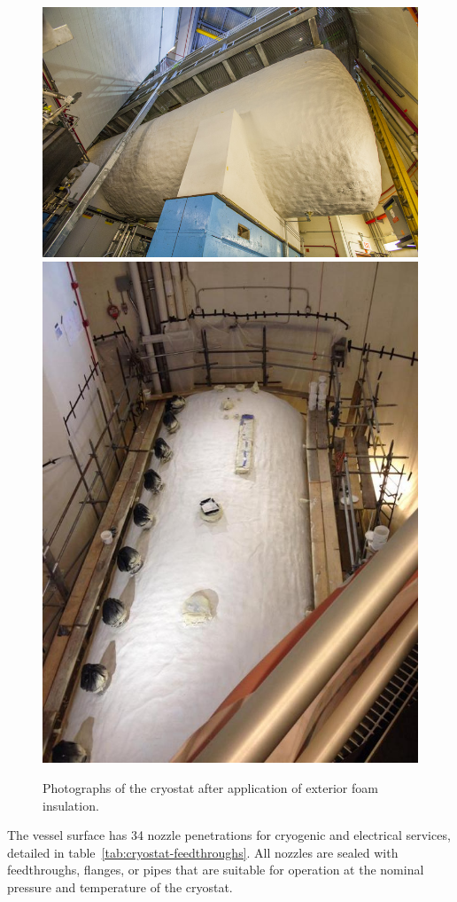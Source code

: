 \begin{figure}[htb]
\centering	
\includegraphics[width=0.68\linewidth]{figures/14-0222-03D.jpg}\\
\includegraphics[width=0.68\linewidth]{figures/foam2.jpg}
\caption{Photographs of the cryostat after application of exterior foam insulation.}
\label{fig:cryostat-foam}
\end{figure}


The vessel surface has 34 nozzle penetrations for cryogenic and electrical services, detailed in table~\ref{tab:cryostat-feedthroughs}.  All nozzles are sealed with feedthroughs, flanges, or pipes that are suitable for operation at the nominal pressure and temperature of the cryostat.  

